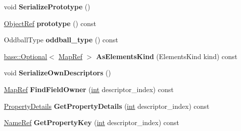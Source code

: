 \begin{DoxyCompactItemize}
\mbox{\label{classv8_1_1internal_1_1compiler_1_1MapRef_aad52459fb2ae6199393b9a892ea3ed75}} 
void {\bfseries Serialize\+Prototype} ()
\item 
\mbox{\label{classv8_1_1internal_1_1compiler_1_1MapRef_a71a6748b7d767c0dfbe314a9ebedb0de}} 
\mbox{\hyperlink{classv8_1_1internal_1_1compiler_1_1ObjectRef}{Object\+Ref}} {\bfseries prototype} () const
\item 
\mbox{\label{classv8_1_1internal_1_1compiler_1_1MapRef_a48791cb7c8a92d7da937752d9b880a2c}} 
Oddball\+Type {\bfseries oddball\+\_\+type} () const
\item 
\mbox{\label{classv8_1_1internal_1_1compiler_1_1MapRef_aec076920773f683dab1eab85da976145}} 
\mbox{\hyperlink{classv8_1_1base_1_1Optional}{base\+::\+Optional}}$<$ \mbox{\hyperlink{classv8_1_1internal_1_1compiler_1_1MapRef}{Map\+Ref}} $>$ {\bfseries As\+Elements\+Kind} (Elements\+Kind kind) const
\item 
\mbox{\label{classv8_1_1internal_1_1compiler_1_1MapRef_a4d7ad0aa91bcd85cbce9f6b8c4130fde}} 
void {\bfseries Serialize\+Own\+Descriptors} ()
\item 
\mbox{\label{classv8_1_1internal_1_1compiler_1_1MapRef_a518902d79b127b69706a0e8e45ad4d77}} 
\mbox{\hyperlink{classv8_1_1internal_1_1compiler_1_1MapRef}{Map\+Ref}} {\bfseries Find\+Field\+Owner} (\mbox{\hyperlink{classint}{int}} descriptor\+\_\+index) const
\item 
\mbox{\label{classv8_1_1internal_1_1compiler_1_1MapRef_a63606f4e67dea44e3215ed967c6793a9}} 
\mbox{\hyperlink{classv8_1_1internal_1_1PropertyDetails}{Property\+Details}} {\bfseries Get\+Property\+Details} (\mbox{\hyperlink{classint}{int}} descriptor\+\_\+index) const
\item 
\mbox{\label{classv8_1_1internal_1_1compiler_1_1MapRef_afe4778fc9b43349aa33698f5eb73d918}} 
\mbox{\hyperlink{classv8_1_1internal_1_1compiler_1_1NameRef}{Name\+Ref}} {\bfseries Get\+Property\+Key} (\mbox{\hyperlink{classint}{int}} descriptor\+\_\+index) const

\end{DoxyCompactItemize}
